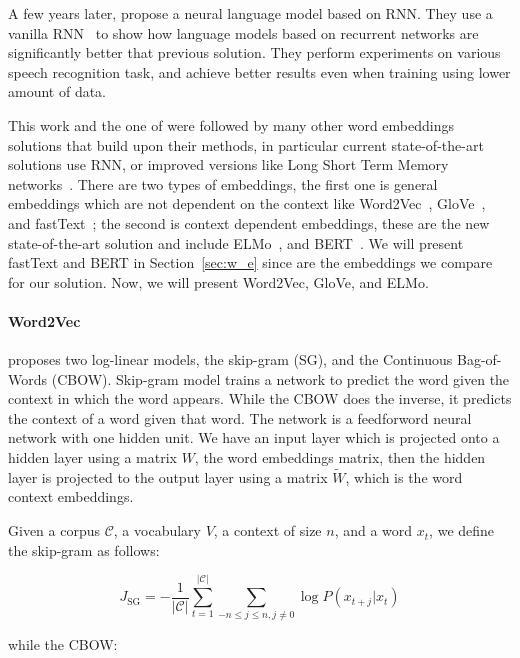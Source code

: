 A few years later, \citet{Mikolov2010RecurrentNN} propose a neural language model based on RNN. They use a vanilla RNN~\citep{elman1990finding} to show how language models based on recurrent networks are significantly better that previous solution. They perform experiments on various speech recognition task, and achieve better results even when training using lower amount of data.

This work and the one of \cite{bengio2000nnlm} were followed by many other word embeddings solutions that build upon their methods, in particular current state-of-the-art solutions use RNN, or improved versions like Long Short Term Memory networks~\citep{hochreiter1997long}. There are two types of embeddings, the first one is general embeddings which are not dependent on the context like Word2Vec~\citep{mikolov2013models,mikolov2013distributed}, GloVe~\citep{pennington2014glove}, and fastText~\citep{bojanowski2016enriching}; the second is context dependent embeddings, these are the new state-of-the-art solution and include ELMo~\citep{peters2018elmo}, and BERT~\citep{devlin2018bert}. We will present fastText and BERT in Section~\ref{sec:w_e} since are the embeddings we compare for our solution. Now, we will present Word2Vec, GloVe, and ELMo.


\paragraph{Word2Vec} \cite{mikolov2013models} proposes two log-linear models, the skip-gram (SG), and the Continuous Bag-of-Words (CBOW). Skip-gram model trains a network to predict the word given the context in which the word appears. While the CBOW does the inverse, it predicts the context of a word given that word. The network is a feedforword neural network with one hidden unit. We have an input layer which is projected onto a hidden layer using a matrix $W$, the word embeddings matrix, then the hidden layer is projected to the output layer using a matrix $\tilde{W}$, which is the word context embeddings. 

Given a corpus $\mathcal{C}$, a vocabulary $V$, a context of size $n$, and a word $x_t$, we define the skip-gram as follows:

\begin{equation}
J_{\mathrm{SG}}=-\frac{1}{|\mathcal{C}|} \sum_{t=1}^{|\mathcal{C}|} \sum_{-n \leq j \leq n, j \neq 0} \log P\left(x_{t+j} | x_{t}\right)
\end{equation}

while the CBOW:

